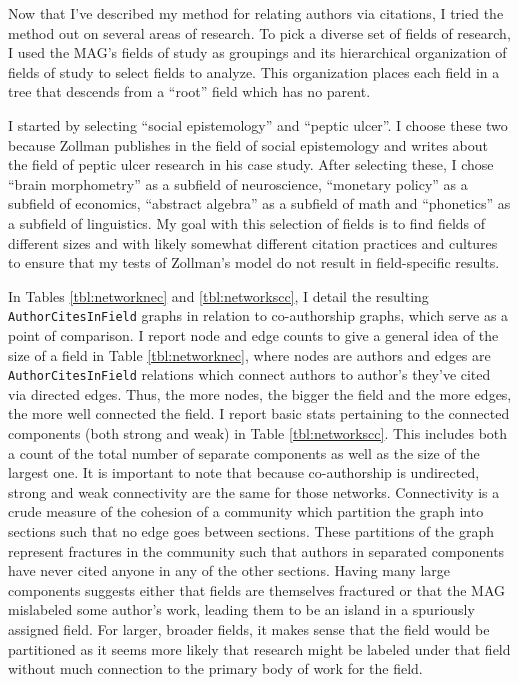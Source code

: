 Now that I've described my method for relating authors via citations, I
tried the method out on several areas of research. To pick a diverse set
of fields of research, I used the MAG's fields of study as groupings and
its hierarchical organization of fields of study to select fields to
analyze. This organization places each field in a tree that descends
from a ``root'' field which has no parent.

I started by selecting ``social epistemology'' and ``peptic ulcer''. I
choose these two because Zollman publishes in the field of social
epistemology and writes about the field of peptic ulcer research in his
case study. After selecting these, I chose ``brain morphometry'' as a
subfield of neuroscience, ``monetary policy'' as a subfield of
economics, ``abstract algebra'' as a subfield of math and ``phonetics''
as a subfield of linguistics. My goal with this selection of fields is
to find fields of different sizes and with likely somewhat different
citation practices and cultures to ensure that my tests of Zollman's
model do not result in field-specific results.

In Tables \ref{tbl:networknec} and \ref{tbl:networkscc}, I detail the
resulting \texttt{AuthorCitesInField} graphs in relation to
co-authorship graphs, which serve as a point of comparison. I report
node and edge counts to give a general idea of the size of a field in
Table \ref{tbl:networknec}, where nodes are authors and edges are
\texttt{AuthorCitesInField} relations which connect authors to author's
they've cited via directed edges. Thus, the more nodes, the bigger the
field and the more edges, the more well connected the field. I report
basic stats pertaining to the connected components (both strong and
weak) in Table \ref{tbl:networkscc}. This includes both a count of the
total number of separate components as well as the size of the largest
one. It is important to note that because co-authorship is undirected,
strong and weak connectivity are the same for those networks.
Connectivity is a crude measure of the cohesion of a community which
partition the graph into sections such that no edge goes between
sections. These partitions of the graph represent fractures in the
community such that authors in separated components have never cited
anyone in any of the other sections. Having many large components
suggests either that fields are themselves fractured or that the MAG
mislabeled some author's work, leading them to be an island in a
spuriously assigned field. For larger, broader fields, it makes sense
that the field would be partitioned as it seems more likely that
research might be labeled under that field without much connection to
the primary body of work for the field.

